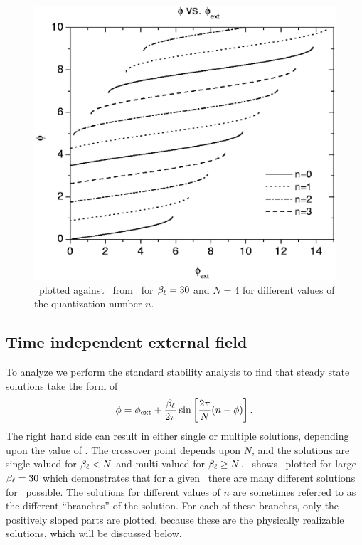 %
%
\begin{figure}[p]
\includegraphics[width=5.7in]{figs/jjarray/chap2fig3.ps}
\caption[\phitot\ plotted against \phiext\ for $\betal= 30$
and $N=4$ for different values of the quantization number $n$.]
{\phitot\ plotted against \phiext\ from
\protect{}\ for $\betal= 30$
and $N=4$ for different values of the quantization number $n$.
}
\label{fig:steady_state_multivariate_solution}
\end{figure}


\subsection{Time independent external field}

To analyze 
 we perform the standard stability analysis
\cite{ott} to find
that steady state solutions take the form of 
%
\begin{equation}
\label{eqn:steadystatesolution}
\phi = \phi_{\mathrm{ext}} + {\beta_\ell \over 2 \pi} \sin \left[{2 \pi \over N} (n -
                           \phi) \right]
\mathrm{.}
\end{equation}
%
The right hand side can result in either single or multiple solutions,
depending upon the value of \betal. The crossover point depends 
upon $N$, and the solutions are single-valued for $\beta_\ell < N$ and
multi-valued for $\beta_\ell \geq N$. 
\ shows 
\ plotted for large $\betal= 30$
which demonstrates that for a given \phiext\ there are many different
solutions for \phitot\ possible. The solutions for different values
of $n$ are sometimes referred to as the different ``branches'' of the
solution. For each of these branches, only the positively sloped 
parts are plotted, because these are the physically realizable solutions,
which will be discussed below. 

